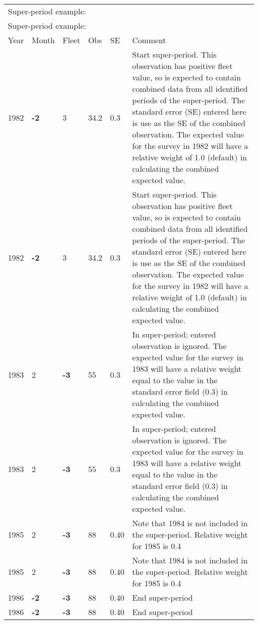 \begin{center}
	\vspace*{-\baselineskip}
	\vspace*{-\baselineskip}
	\begin{tabular}{p{1cm} p{1cm} p{1cm} p{1cm} p{1cm} p{9cm}}
		\multicolumn{6}{l}{Super-period example:} \\
		\multicolumn{6}{l}{Super-period example:} \\
		\hline
		Year & Month & Fleet & Obs & SE & Comment \Tstrut\Bstrut\\
		\hline
		1982 \Tstrut & \textbf{-2} & 3 & 34.2 & 0.3 & Start super-period. This observation has positive fleet value, so is expected to contain combined data from all identified periods of the super-period. The standard error (SE) entered here is use as the SE of the combined observation. The expected value for the survey in 1982 will have a relative weight of 1.0 (default) in calculating the combined expected value.\Bstrut\\
		1982 \Tstrut & \textbf{-2} & 3 & 34.2 & 0.3 & Start super-period. This observation has positive fleet value, so is expected to contain combined data from all identified periods of the super-period. The standard error (SE) entered here is use as the SE of the combined observation. The expected value for the survey in 1982 will have a relative weight of 1.0 (default) in calculating the combined expected value.\Bstrut\\
		\hline
		1983 \Tstrut & 2 & \textbf{-3} & 55 & 0.3 & In super-period; entered observation is ignored. The expected value for the survey in 1983 will have a relative weight equal to the value in the standard error field (0.3) in calculating the combined expected value. \Bstrut\\
		1983 \Tstrut & 2 & \textbf{-3} & 55 & 0.3 & In super-period; entered observation is ignored. The expected value for the survey in 1983 will have a relative weight equal to the value in the standard error field (0.3) in calculating the combined expected value. \Bstrut\\
		\hline
		1985 \Tstrut & 2 & \textbf{-3}& 88 & 0.40 & Note that 1984 is not included in the super-period. Relative weight for 1985 is 0.4 \Bstrut\\
		1985 \Tstrut & 2 & \textbf{-3}& 88 & 0.40 & Note that 1984 is not included in the super-period. Relative weight for 1985 is 0.4 \Bstrut\\
		\hline
		1986 & \textbf{-2} & \textbf{-3} & 88 & 0.40 & End super-period \Tstrut\Bstrut\\
		1986 & \textbf{-2} & \textbf{-3} & 88 & 0.40 & End super-period \Tstrut\Bstrut\\
		\hline
	\end{tabular}
\end{center}

